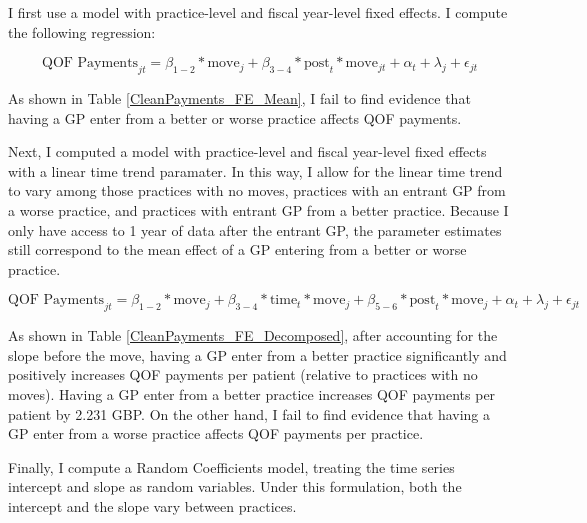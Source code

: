\documentclass[11pt]{article}
\begin{document}
I first use a model with practice-level and fiscal year-level fixed effects. I compute the following regression:

\begin{equation}\label{CleanPayments_FE_Mean}
  \textrm{QOF Payments}_{jt} = \beta_{1-2}*\textrm{move}_{j} + \beta_{3-4}*\textrm{post}_{t}*\textrm{move}_{jt} + \alpha_{t} + \lambda_{j} + \epsilon_{jt}
\end{equation}

As shown in Table \ref{CleanPayments_FE_Mean}, I fail to find evidence that having a GP enter from a better or worse practice affects QOF payments.



Next, I computed a model with practice-level and fiscal year-level fixed effects with a linear time trend paramater. In this way, I allow for the linear time trend to vary among those practices with no moves, practices with an entrant GP from a worse practice, and practices with entrant GP from a better practice. Because I only have access to 1 year of data after the entrant GP, the parameter estimates still correspond to the mean effect of a GP entering from a better or worse practice.

\begin{equation}\label{CleanPayments_FE_Decomposed}
  \textrm{QOF Payments}_{jt} = \beta_{1-2}*\textrm{move}_{j} + \beta_{3-4}*\textrm{time}_{t}*\textrm{move}_{j} + \beta_{5-6}*\textrm{post}_{t}*\textrm{move}_{j} + \alpha_{t} + \lambda_{j} + \epsilon_{jt}
\end{equation}

As shown in Table \ref{CleanPayments_FE_Decomposed}, after accounting for the slope before the move, having a GP enter from a better practice significantly and positively increases QOF payments per patient (relative to practices with no moves). Having a GP enter from a better practice increases QOF payments per patient by 2.231 GBP. On the other hand, I fail to find evidence that having a GP enter from a worse practice affects QOF payments per practice.



Finally, I compute a Random Coefficients model, treating the time series intercept and slope as random variables. Under this formulation, both the intercept and the slope vary between practices.


\end{document}
